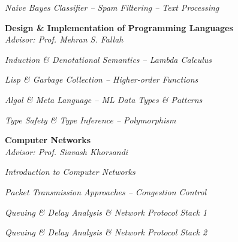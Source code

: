 \documentclass[margin, 10pt]{res} %
\begin{document}
\begin{resume}
\begin{innerlist}
			\item \textit{Naive Bayes Classifier -- Spam Filtering -- Text Processing} \href{https://github.com/aligholamee/Datadigger/raw/master/docs/assignment-3/report/DM_9531504_HW3.pdf}{\hfill\UrlFont[docs]}
		\end{innerlist}

        \textbf{Design \& Implementation of Programming Languages}\\
    	\textit{Advisor: Prof. Mehran S. Fallah}
	    \begin{innerlist}
	    	\item \textit{Induction \& Denotational Semantics -- Lambda Calculus} \href{https://github.com/aligholamee/HALFLIFE/raw/master/reports/PL29531504.pdf}{\hfill\UrlFont[docs]}
	    	\item \textit{Lisp \& Garbage Collection -- Higher-order Functions} \href{https://github.com/aligholamee/HALFLIFE/raw/master/reports/PL39531504.pdf}{\hfill\UrlFont[docs]}
	    	\item \textit{Algol \& Meta Language -- ML Data Types \& Patterns} \href{https://github.com/aligholamee/HALFLIFE/raw/master/reports/PL49531504.pdf}{\hfill\UrlFont[docs]}
	    	\item \textit{Type Safety \& Type Inference -- Polymorphism} \href{https://github.com/aligholamee/HALFLIFE/raw/master/reports/PL49531504.pdf}{\hfill\UrlFont[docs]}
	    \end{innerlist}

        \textbf{Computer Networks}\\
		\textit{Advisor: Prof. Siavash Khorsandi}
		\begin{innerlist}
			\item \textit{Introduction to Computer Networks} \href{https://github.com/aligholamee/Compnets/raw/master/docs/assignment-1/compnet_assignment_1_9531504.pdf}{\hfill\UrlFont[docs]}
		
			\item \textit{Packet Transmission Approaches -- Congestion Control} \href{https://github.com/aligholamee/Compnets/raw/master/docs/assignment-2/compnet_assignment_2_9531504.pdf}{\hfill\UrlFont[docs]}

			\item \textit{Queuing \& Delay Analysis \& Network Protocol Stack 1} \href{https://github.com/aligholamee/Compnets/raw/master/docs/assignment-3/compnet_assignment_3_9531504.pdf}{\hfill\UrlFont[docs]}
			
			\item \textit{Queuing \& Delay Analysis \& Network Protocol Stack 2} \href{https://github.com/aligholamee/Compnets/raw/master/docs/assignment-4/compnet_assignment_4_9531504.pdf}{\hfill\UrlFont[docs]}
			

\end{innerlist}
\end{resume}
\end{document}
